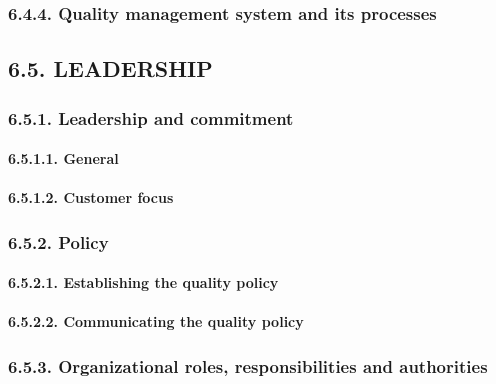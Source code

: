 \documentclass[
]{article}
\begin{document}
\hypertarget{quality-management-system-and-its-processes}{%
\subsubsection{6.4.4. Quality management system and its
processes}\label{quality-management-system-and-its-processes}}

\hypertarget{leadership}{%
\subsection{6.5. LEADERSHIP}\label{leadership}}

\hypertarget{leadership-and-commitment}{%
\subsubsection{6.5.1. Leadership and
commitment}\label{leadership-and-commitment}}

\hypertarget{general}{%
\paragraph{6.5.1.1. General}\label{general}}

\hypertarget{customer-focus}{%
\paragraph{6.5.1.2. Customer focus}\label{customer-focus}}

\hypertarget{policy}{%
\subsubsection{6.5.2. Policy}\label{policy}}

\hypertarget{establishing-the-quality-policy}{%
\paragraph{6.5.2.1. Establishing the quality
policy}\label{establishing-the-quality-policy}}

\hypertarget{communicating-the-quality-policy}{%
\paragraph{6.5.2.2. Communicating the quality
policy}\label{communicating-the-quality-policy}}

\hypertarget{organizational-roles-responsibilities-and-authorities}{%
\subsubsection{6.5.3. Organizational roles, responsibilities and
authorities}\label{organizational-roles-responsibilities-and-authorities}}
\end{document}
